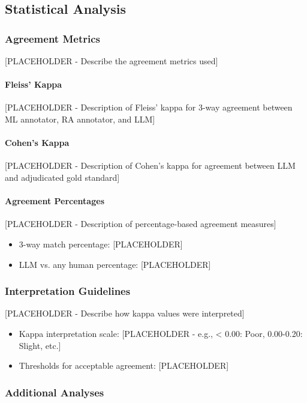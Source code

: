 \documentclass[12pt]{article}
\begin{document}
\subsection{Statistical Analysis}

\subsubsection{Agreement Metrics}

[PLACEHOLDER - Describe the agreement metrics used]

\paragraph{Fleiss' Kappa}
[PLACEHOLDER - Description of Fleiss' kappa for 3-way agreement between ML annotator, RA annotator, and LLM]

\paragraph{Cohen's Kappa}
[PLACEHOLDER - Description of Cohen's kappa for agreement between LLM and adjudicated gold standard]

\paragraph{Agreement Percentages}
[PLACEHOLDER - Description of percentage-based agreement measures]
\begin{itemize}
    \item 3-way match percentage: [PLACEHOLDER]
    \item LLM vs. any human percentage: [PLACEHOLDER]
\end{itemize}

\subsubsection{Interpretation Guidelines}

[PLACEHOLDER - Describe how kappa values were interpreted]
\begin{itemize}
    \item Kappa interpretation scale: [PLACEHOLDER - e.g., < 0.00: Poor, 0.00-0.20: Slight, etc.]
    \item Thresholds for acceptable agreement: [PLACEHOLDER]
\end{itemize}

\subsubsection{Additional Analyses}
\end{document}
